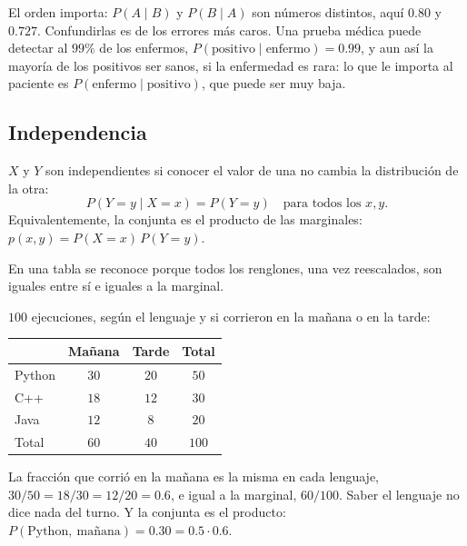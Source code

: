 \documentclass[11pt,letterpaper]{article}
\begin{document}
\begin{ojo}
    El orden importa: $P(A \mid B)$ y $P(B \mid A)$ son números
    distintos, aquí $0.80$ y $0.727$. Confundirlas es de los errores
    más caros. Una prueba médica puede detectar al $99\%$ de los
    enfermos, $P(\text{positivo} \mid \text{enfermo}) = 0.99$, y aun así
    la mayoría de los positivos ser sanos, si la enfermedad es rara:
    lo que le importa al paciente es
    $P(\text{enfermo} \mid \text{positivo})$, que puede ser muy baja.
\end{ojo}


\subsection*{Independencia}

\begin{definicion}
    $X$ y $Y$ son independientes si conocer el valor de una no cambia
    la distribución de la otra:
    \[
        P(Y = y \mid X = x) = P(Y = y)
        \quad \text{para todos los } x, y .
    \]
    Equivalentemente, la conjunta es el producto de las marginales:
    $p(x, y) = P(X = x)\, P(Y = y)$.
\end{definicion}

En una tabla se reconoce porque todos los renglones, una vez
reescalados, son iguales entre sí e iguales a la marginal.

\begin{ejemplo}
    $100$ ejecuciones, según el lenguaje y si corrieron en la mañana o
    en la tarde:
    \begin{center}
    \begin{tabular}{lccc}
        \toprule
        & \textbf{Mañana} & \textbf{Tarde} & \textbf{Total} \\
        \midrule
        Python & $30$ & $20$ & $50$ \\
        C++    & $18$ & $12$ & $30$ \\
        Java   & $12$ & $8$  & $20$ \\
        \midrule
        Total  & $60$ & $40$ & $100$ \\
        \bottomrule
    \end{tabular}
    \end{center}
    La fracción que corrió en la mañana es la misma en cada lenguaje,
    $30/50 = 18/30 = 12/20 = 0.6$, e igual a la marginal, $60/100$.
    Saber el lenguaje no dice nada del turno. Y la conjunta es el
    producto: $P(\text{Python},\ \text{mañana}) = 0.30 = 0.5 \cdot 0.6$.
\end{ejemplo}
\end{document}
